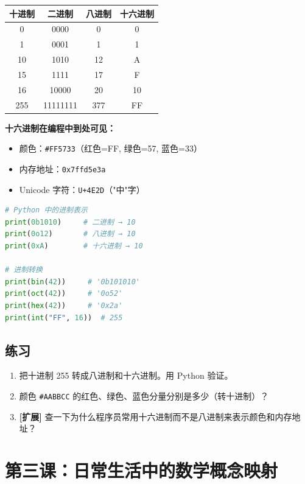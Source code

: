 \documentclass[a4paper,12pt]{ctexart}
\begin{document}
\begin{center}
\begin{tabular}{|c|c|c|c|}
\hline
\textbf{十进制} & \textbf{二进制} & \textbf{八进制} & \textbf{十六进制} \\ \hline
0 & 0000 & 0 & 0 \\ \hline
1 & 0001 & 1 & 1 \\ \hline
10 & 1010 & 12 & A \\ \hline
15 & 1111 & 17 & F \\ \hline
16 & 10000 & 20 & 10 \\ \hline
255 & 11111111 & 377 & FF \\ \hline
\end{tabular}
\end{center}

\textbf{十六进制在编程中到处可见：}
\begin{itemize}
  \item 颜色：\texttt{\#FF5733}（红色=FF, 绿色=57, 蓝色=33）
  \item 内存地址：\texttt{0x7ffd5e3a}
  \item Unicode 字符：\texttt{U+4E2D}（"中"字）
\end{itemize}

\begin{lstlisting}[language=Python]
# Python 中的进制表示
print(0b1010)     # 二进制 → 10
print(0o12)       # 八进制 → 10
print(0xA)        # 十六进制 → 10

# 进制转换
print(bin(42))     # '0b101010'
print(oct(42))     # '0o52'
print(hex(42))     # '0x2a'
print(int("FF", 16))  # 255
\end{lstlisting}

\subsection*{练习}

\begin{enumerate}
  \item 把十进制 255 转成八进制和十六进制。用 Python 验证。
  \item 颜色 \texttt{\#AABBCC} 的红色、绿色、蓝色分量分别是多少（转十进制）？
  \item \textbf{[扩展]} 查一下为什么程序员常用十六进制而不是八进制来表示颜色和内存地址？
\end{enumerate}

\section*{第三课：日常生活中的数学概念映射}
\end{document}
